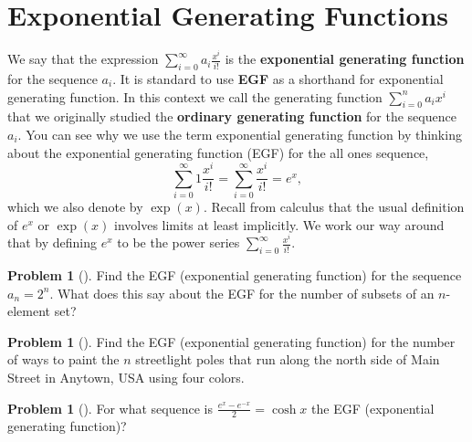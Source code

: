 \documentclass[10pt,]{book}
\newcommand{\terminology}[1]{\textbf{#1}}
\theoremstyle{plain}
\theoremstyle{definition}
\newtheorem{activity}[project]{Problem}
\theoremstyle{definition}
\numberwithin{equation}{chapter}
\begin{document}
\section[{Exponential Generating Functions}]{Exponential Generating Functions}\label{app3-2-expogenfns}
\hypertarget{p-2045}{}%
We say that the expression \(\sum_{i=0}^\infty a_i\frac{x^i}{i!}\) is the \terminology{exponential generating function} for the sequence \(a_i\). It is standard to use \terminology{EGF} as a shorthand for exponential generating function. In this context we call the generating function \(\sum_{i=0}^n a_ix^i\) that we originally studied the \terminology{ordinary generating function} for the sequence \(a_i\). You can see why we use the term exponential generating function by thinking about the exponential generating function (EGF) for the all ones sequence,%
\begin{equation*}
\sum_{i=0}^\infty 1\frac{x^i}{i!} = \sum_{i=0}^\infty \frac{x^i}{i!}
=e^x,
\end{equation*}
which we also denote by \(\exp (x)\). Recall from calculus that the usual definition of \(e^x\) or \(\exp(x)\) involves limits at least implicitly. We work our way around that by defining \(e^x\) to be the power series \(\sum_{i=0}^\infty
\frac{x^i}{i!}\).%
\begin{activity}[] \label{egf2n}
\hypertarget{p-2046}{}%
Find the EGF (exponential generating function) for the sequence \(a_n=2^n\). What does this say about the EGF for the number of subsets of an \(n\)-element set?%
\end{activity}
\begin{activity}[] \label{paintinglightpoles}
\hypertarget{p-2048}{}%
Find the EGF (exponential generating function) for the number of ways to paint the \(n\) streetlight poles that run along the north side of Main Street in Anytown, USA using four colors.%
\end{activity}
\begin{activity}[]\marginsymbol[-1em]{} \label{activity-374}
\hypertarget{p-2050}{}%
For what sequence is \(\frac{e^x-e^{-x}}{2} =\cosh x\) the EGF (exponential generating function)?%
\end{activity}
\end{document}
